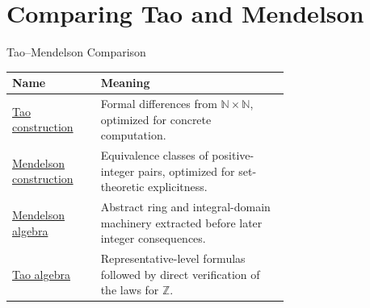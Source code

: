 \section{Comparing Tao and Mendelson}

\begin{toolkitbox}{Tao--Mendelson Comparison}
\small
\begin{tabular}{l p{0.68\linewidth}}
\toprule
\textbf{Name} & \textbf{Meaning} \\
\midrule
\hyperref[def:tao-integer-expression]{Tao construction} & Formal differences from \(\mathbb{N}\times\mathbb{N}\), optimized for concrete computation. \\
\hyperref[def:men-integers]{Mendelson construction} & Equivalence classes of positive-integer pairs, optimized for set-theoretic explicitness. \\
\hyperref[def:men-ring-integral-domain]{Mendelson algebra} & Abstract ring and integral-domain machinery extracted before later integer consequences. \\
\hyperref[def:tao-integer-operations]{Tao algebra} & Representative-level formulas followed by direct verification of the laws for \(\mathbb{Z}\). \\
\bottomrule
\end{tabular}
\end{toolkitbox}


